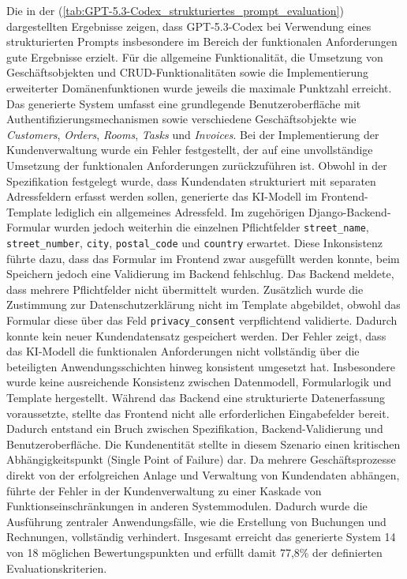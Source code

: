 \newpage


Die in der (\ref{tab:GPT-5.3-Codex_strukturiertes_prompt_evaluation}) dargestellten Ergebnisse zeigen, dass GPT-5.3-Codex bei Verwendung eines strukturierten Prompts insbesondere im Bereich der funktionalen Anforderungen gute Ergebnisse erzielt. Für die allgemeine Funktionalität, die Umsetzung von Geschäftsobjekten und CRUD-Funktionalitäten sowie die Implementierung erweiterter Domänenfunktionen wurde jeweils die maximale Punktzahl erreicht. Das generierte System umfasst eine grundlegende Benutzeroberfläche mit Authentifizierungsmechanismen sowie verschiedene Geschäftsobjekte wie \textit{Customers}, \textit{Orders}, \textit{Rooms}, \textit{Tasks} und \textit{Invoices}. 
Bei der Implementierung der Kundenverwaltung wurde ein Fehler festgestellt, der auf eine unvollständige Umsetzung der funktionalen Anforderungen zurückzuführen ist. Obwohl in der Spezifikation festgelegt wurde, dass Kundendaten strukturiert mit separaten Adressfeldern erfasst werden sollen, generierte das KI-Modell im Frontend-Template lediglich ein allgemeines Adressfeld. Im zugehörigen Django-Backend-Formular wurden jedoch weiterhin die einzelnen Pflichtfelder \texttt{street\_name}, \texttt{street\_number}, \texttt{city}, \texttt{postal\_code} und \texttt{country} erwartet.
Diese Inkonsistenz führte dazu, dass das Formular im Frontend zwar ausgefüllt werden konnte, beim Speichern jedoch eine Validierung im Backend fehlschlug. Das Backend meldete, dass mehrere Pflichtfelder nicht übermittelt wurden. Zusätzlich wurde die Zustimmung zur Datenschutzerklärung nicht im Template abgebildet, obwohl das Formular diese über das Feld \texttt{privacy\_consent} verpflichtend validierte. Dadurch konnte kein neuer Kundendatensatz gespeichert werden.
Der Fehler zeigt, dass das KI-Modell die funktionalen Anforderungen nicht vollständig über die beteiligten Anwendungsschichten hinweg konsistent umgesetzt hat. Insbesondere wurde keine ausreichende Konsistenz zwischen Datenmodell, Formularlogik und Template hergestellt. Während das Backend eine strukturierte Datenerfassung voraussetzte, stellte das Frontend nicht alle erforderlichen Eingabefelder bereit. Dadurch entstand ein Bruch zwischen Spezifikation, Backend-Validierung und Benutzeroberfläche.
Die Kundenentität stellte in diesem Szenario einen kritischen Abhängigkeitspunkt (Single Point of Failure) dar. Da mehrere Geschäftsprozesse direkt von der erfolgreichen Anlage und Verwaltung von Kundendaten abhängen, führte der Fehler in der Kundenverwaltung zu einer Kaskade von Funktionseinschränkungen in anderen Systemmodulen. Dadurch wurde die Ausführung zentraler Anwendungsfälle, wie die Erstellung von Buchungen und Rechnungen, vollständig verhindert.
Insgesamt erreicht das generierte System 14 von 18 möglichen Bewertungspunkten und erfüllt damit 77,8\% der definierten Evaluationskriterien.
